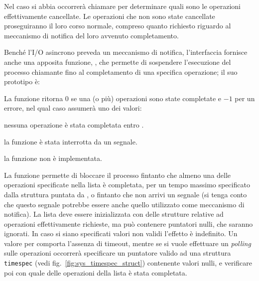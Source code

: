 Nel caso si abbia  occorrerà chiamare
 per determinare quali sono le operazioni effettivamente
cancellate. Le operazioni che non sono state cancellate proseguiranno il loro
corso normale, compreso quanto richiesto riguardo al meccanismo di notifica
del loro avvenuto completamento.

Benché l'I/O asincrono preveda un meccanismo di notifica, l'interfaccia
fornisce anche una apposita funzione, , che permette di
sospendere l'esecuzione del processo chiamante fino al completamento di una
specifica operazione; il suo prototipo è:

\begin{funcproto}{
}

{La funzione ritorna $0$ se una (o più) operazioni sono state completate e
  $-1$ per un errore, nel qual caso  assumerà uno dei valori:
  \begin{errlist}
    \item[\errcode{EAGAIN}] nessuna operazione è stata completata entro
      .
    \item[\errcode{EINTR}] la funzione è stata interrotta da un segnale.
    \item[\errcode{ENOSYS}] la funzione non è implementata.
  \end{errlist}
}
\end{funcproto}
  
La funzione permette di bloccare il processo fintanto che almeno una delle
 operazioni specificate nella lista  è completata, per
un tempo massimo specificato dalla struttura  puntata
da , o fintanto che non arrivi un segnale (si tenga conto che
questo segnale potrebbe essere anche quello utilizzato come meccanismo di
notifica). La lista deve essere inizializzata con delle strutture
 relative ad operazioni effettivamente richieste, ma può
contenere puntatori nulli, che saranno ignorati. In caso si siano specificati
valori non validi l'effetto è indefinito.  
Un valore  per  comporta l'assenza di timeout, mentre
se si vuole effettuare un \textit{polling} sulle operazioni occorrerà
specificare un puntatore valido ad una struttura \texttt{timespec} (vedi
fig.~\ref{fig:sys_timespec_struct}) contenente valori nulli, e verificare poi
con  quale delle operazioni della lista  è stata
completata.

